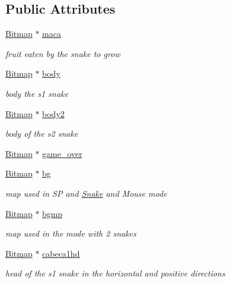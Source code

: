 \subsection*{Public Attributes}
\begin{DoxyCompactItemize}
\item 
\hyperlink{structBitmap}{Bitmap} $\ast$ \hyperlink{group__graphics_ga90d36683bc99f1ee114191f6ae238990}{maca}
\begin{DoxyCompactList}\small\item\em fruit eaten by the snake to grow \end{DoxyCompactList}\item 
\hyperlink{structBitmap}{Bitmap} $\ast$ \hyperlink{group__graphics_gaa22a993c184e8cd76dbdf4830e5d108e}{body}
\begin{DoxyCompactList}\small\item\em body the s1 snake \end{DoxyCompactList}\item 
\hyperlink{structBitmap}{Bitmap} $\ast$ \hyperlink{group__graphics_ga8b84da2f75b89636fa34ff1cd47215f4}{body2}
\begin{DoxyCompactList}\small\item\em body of the s2 snake \end{DoxyCompactList}\item 
\hyperlink{structBitmap}{Bitmap} $\ast$ \hyperlink{group__graphics_ga0145b28638489d1308f15646be8042eb}{game\+\_\+over}
\item 
\hyperlink{structBitmap}{Bitmap} $\ast$ \hyperlink{group__graphics_ga2b3fa0b4fba818dec225a5cfa4ad2400}{bg}
\begin{DoxyCompactList}\small\item\em map used in SP and \hyperlink{structSnake}{Snake} and Mouse mode \end{DoxyCompactList}\item 
\hyperlink{structBitmap}{Bitmap} $\ast$ \hyperlink{group__graphics_gaca55c5a5f1494cb6d6c872d072b501d1}{bgmp}
\begin{DoxyCompactList}\small\item\em map used in the mode with 2 snakes \end{DoxyCompactList}\item 
\hyperlink{structBitmap}{Bitmap} $\ast$ \hyperlink{group__graphics_ga7740065d096144bd6f6f9457083584d9}{cabeca1hd}
\begin{DoxyCompactList}\small\item\em head of the s1 snake in the horizontal and positive directions \end{DoxyCompactList}\item 

\end{DoxyCompactItemize}

